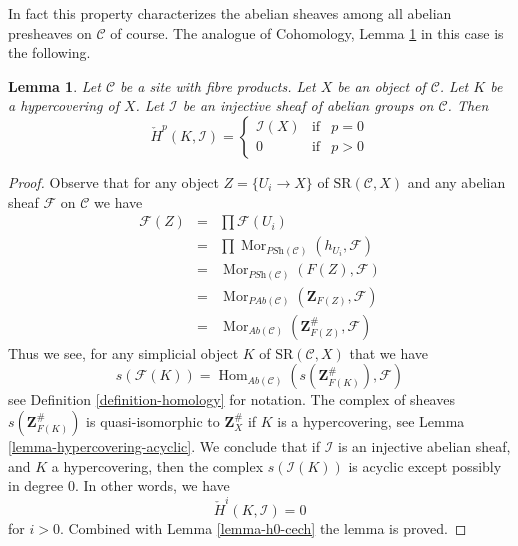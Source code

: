 \documentclass[10pt,a4paper]{article}
\theoremstyle{plain}
\newtheorem{lemma}[subsection]{Lemma}
\theoremstyle{definition}
\theoremstyle{remark}
\numberwithin{equation}{subsection}
\def\Hom{\mathop{\mathrm{Hom}}\nolimits}
\def\Mor{\mathop{\mathrm{Mor}}\nolimits}
\begin{document}
\noindent
In fact this property characterizes the abelian sheaves among all
abelian presheaves on $\mathcal{C}$ of course.
The analogue of Cohomology, Lemma \ref{lemma-injective-trivial-cech}
in this case is the following.

\begin{lemma}
\label{lemma-injective-trivial-cech}
Let $\mathcal{C}$ be a site with fibre products.
Let $X$ be an object of $\mathcal{C}$.
Let $K$ be a hypercovering of $X$.
Let $\mathcal{I}$ be an injective sheaf of abelian groups on $\mathcal{C}$.
Then
$$
\check{H}^p(K, \mathcal{I}) =
\left\{
\begin{matrix}
\mathcal{I}(X) & \text{if} & p = 0 \\
0 & \text{if} & p > 0
\end{matrix}
\right.
$$
\end{lemma}

\begin{proof}
Observe that for any object $Z = \{U_i \to X\}$ of
$\text{SR}(\mathcal{C}, X)$ and any abelian sheaf
$\mathcal{F}$ on $\mathcal{C}$ we have
\begin{eqnarray*}
\mathcal{F}(Z)
& = &
\prod \mathcal{F}(U_i) \\
& = &
\prod \Mor_{\textit{PSh}(\mathcal{C})}(h_{U_i}, \mathcal{F})\\
& = &
\Mor_{\textit{PSh}(\mathcal{C})}(F(Z), \mathcal{F})\\
& = &
\Mor_{\textit{PAb}(\mathcal{C})}(\mathbf{Z}_{F(Z)}, \mathcal{F}) \\
& = &
\Mor_{\textit{Ab}(\mathcal{C})}(\mathbf{Z}_{F(Z)}^\#, \mathcal{F})
\end{eqnarray*}
Thus we see, for any simplicial object $K$ of
$\text{SR}(\mathcal{C}, X)$ that we have
\begin{equation}
\label{equation-identify-cech}
s(\mathcal{F}(K))
=
\Hom_{\textit{Ab}(\mathcal{C})}(s(\mathbf{Z}_{F(K)}^\#), \mathcal{F})
\end{equation}
see Definition \ref{definition-homology} for notation.
The complex of sheaves $s(\mathbf{Z}_{F(K)}^\#)$ is quasi-isomorphic
to $\mathbf{Z}_X^\#$ if $K$ is a hypercovering, see
Lemma \ref{lemma-hypercovering-acyclic}. We conclude
that if $\mathcal{I}$ is an injective abelian sheaf, and
$K$ a hypercovering, then the complex $s(\mathcal{I}(K))$
is acyclic except possibly in degree $0$.
In other words, we have
$$
\check{H}^i(K, \mathcal{I}) = 0
$$
for $i > 0$. Combined with Lemma \ref{lemma-h0-cech} the lemma is proved.
\end{proof}
\end{document}
